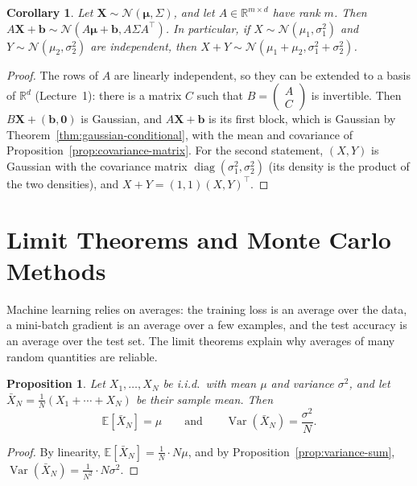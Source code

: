 \documentclass[11pt]{article}
\newcommand{\E}{\mathbb{E}}
\DeclareMathOperator{\Var}{Var}
\theoremstyle{definition}
\theoremstyle{plain}
\newtheorem{proposition}[definition]{Proposition}
\newtheorem{corollary}[definition]{Corollary}
\theoremstyle{remark}
\DeclareMathOperator{\diag}{diag}
\begin{document}
\begin{corollary}\label{cor:gaussian-linear}
    Let $\mathbf{X} \sim \mathcal{N}(\boldsymbol{\mu}, \Sigma)$, and let $A \in \mathbb{R}^{m \times d}$ have rank $m$. Then $A\mathbf{X} + \mathbf{b} \sim \mathcal{N}(A\boldsymbol{\mu} + \mathbf{b}, A\Sigma A^\top)$. In particular, if $X \sim \mathcal{N}(\mu_1, \sigma_1^2)$ and $Y \sim \mathcal{N}(\mu_2, \sigma_2^2)$ are independent, then $X + Y \sim \mathcal{N}(\mu_1 + \mu_2, \sigma_1^2 + \sigma_2^2)$.
\end{corollary}

\begin{proof}
    The rows of $A$ are linearly independent, so they can be extended to a basis of $\mathbb{R}^d$ (Lecture~1): there is a matrix $C$ such that $B = \left(\begin{smallmatrix} A \\ C \end{smallmatrix}\right)$ is invertible. Then $B\mathbf{X} + (\mathbf{b}, \mathbf{0})$ is Gaussian, and $A\mathbf{X} + \mathbf{b}$ is its first block, which is Gaussian by Theorem~\ref{thm:gaussian-conditional}, with the mean and covariance of Proposition~\ref{prop:covariance-matrix}. For the second statement, $(X, Y)$ is Gaussian with the covariance matrix $\diag(\sigma_1^2, \sigma_2^2)$ (its density is the product of the two densities), and $X + Y = (1, 1)(X, Y)^\top$.
\end{proof}

\section{Limit Theorems and Monte Carlo Methods}\label{sec:limits}

Machine learning relies on averages: the training loss is an average over the data, a mini-batch gradient is an average over a few examples, and the test accuracy is an average over the test set. The limit theorems explain why averages of many random quantities are reliable.

\begin{proposition}\label{prop:sample-mean}
    Let $X_1, \ldots, X_N$ be i.i.d.\ with mean $\mu$ and variance $\sigma^2$, and let $\bar X_N = \frac{1}{N}(X_1 + \cdots + X_N)$ be their sample mean. Then
    \[\E[\bar X_N] = \mu \qquad \text{and} \qquad \Var(\bar X_N) = \frac{\sigma^2}{N}.\]
\end{proposition}

\begin{proof}
    By linearity, $\E[\bar X_N] = \frac{1}{N} \cdot N\mu$, and by Proposition~\ref{prop:variance-sum}, $\Var(\bar X_N) = \frac{1}{N^2} \cdot N\sigma^2$.
\end{proof}
\end{document}
